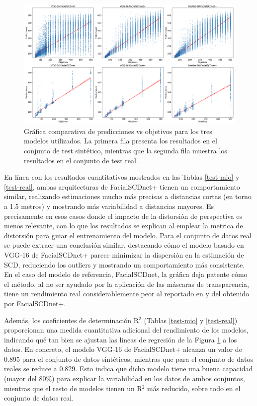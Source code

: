 \begin{figure}[h]
	\centering
	\includegraphics[width=\textwidth]{imagenes/cap5/comp_etiquetas.png}
	\caption[Comparación etiquetas de test.]{Gráfica comparativa de predicciones vs objetivos para los tres modelos utilizados. La primera fila presenta los resultados en el conjunto de test sintético, mientras que la segunda fila muestra los resultados en el conjunto de test real.}
	\label{fig34}
\end{figure}

En línea con los resultados cuantitativos mostrados en las Tablas \ref{test-mio} y \ref{test-real}, ambas arquitecturas de FacialSCDnet+ tienen un comportamiento similar, realizando estimaciones mucho más precisas a distancias cortas (en torno a 1.5 metros) y mostrando más variabilidad a distancias mayores. Es precisamente en esos casos donde el impacto de la distorsión de perspectiva es menos relevante, con lo que los resultados se explican al emplear la metrica de distorsión para guiar el entrenamiento del modelo. Para el conjunto de datos real se puede extraer una conclusión similar, destacando cómo el modelo basado en VGG-16 de FacialSCDnet+ parece minimizar la dispersión en la estimación de SCD, reduciendo los outliers y mostrando un comportamiento más consistente. En el caso del modelo de referencia, FacialSCDnet, la gráfica deja patente cómo el método, al no ser ayudado por la aplicación de las máscaras de transparencia, tiene un rendimiento real considerablemente peor al reportado en \cite{14} y del obtenido por FacialSCDnet+.

Además, los coeficientes de determinación R$^2$ (Tablas \ref{test-mio} y \ref{test-real}) proporcionan una medida cuantitativa adicional del rendimiento de los modelos, indicando qué tan bien se ajustan las líneas de regresión de la Figura \ref{fig34} a los datos. En concreto, el modelo VGG-16 de FacialSCDnet+ alcanza un valor de 0.895 para el conjunto de datos sintéticos, mientras que para el conjunto de datos reales se reduce a 0.829. Esto indica que dicho modelo tiene una buena capacidad (mayor del 80\%) para explicar la variabilidad en los datos de ambos conjuntos, mientras que el resto de modelos tienen un R$^2$ más reducido, sobre todo en el conjunto de datos real.